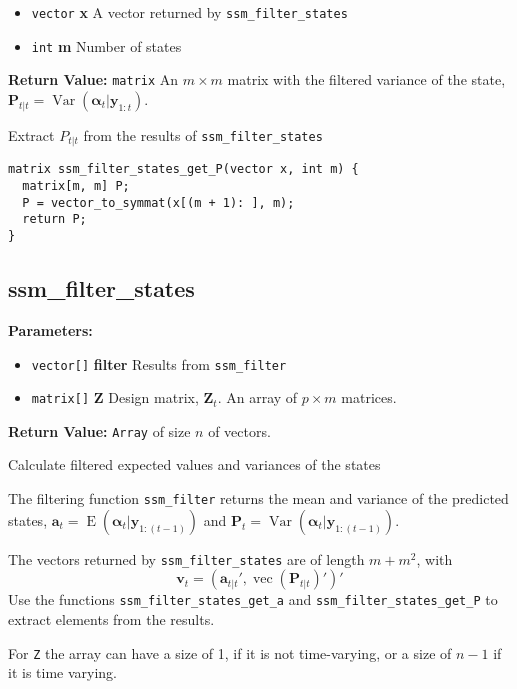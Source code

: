 \documentclass[]{book}
\providecommand{\tightlist}{%
  \setlength{\itemsep}{0pt}\setlength{\parskip}{0pt}}
\DeclareMathOperator{\E}{E}
\DeclareMathOperator{\Var}{Var}
\DeclareMathOperator{\VEC}{vec}
\newcommand{\mat}[1]{\boldsymbol{#1}}
\renewcommand{\vec}[1]{\boldsymbol{#1}}
\begin{document}
\begin{itemize}
\tightlist
\item
  \texttt{vector} \textbf{x} A vector returned by
  \texttt{ssm\_filter\_states}
\item
  \texttt{int} \textbf{m} Number of states
\end{itemize}

\textbf{Return Value:} \texttt{matrix} An \(m \times m\) matrix with the
filtered variance of the state,
\(\mat{P}_{t|t} = \Var(\vec{\alpha}_t | \vec{y}_{1:t})\).

Extract \(P_{t|t}\) from the results of \texttt{ssm\_filter\_states}

\begin{verbatim}
matrix ssm_filter_states_get_P(vector x, int m) {
  matrix[m, m] P;
  P = vector_to_symmat(x[(m + 1): ], m);
  return P;
}
\end{verbatim}

\subsection{ssm\_filter\_states}\label{ssmux5ffilterux5fstates-1}

\textbf{Parameters:}

\begin{itemize}
\tightlist
\item
  \texttt{vector{[}{]}} \textbf{filter} Results from
  \texttt{ssm\_filter}
\item
  \texttt{matrix{[}{]}} \textbf{Z} Design matrix, \(\mat{Z}_t\). An
  array of \(p \times m\) matrices.
\end{itemize}

\textbf{Return Value:} \texttt{Array} of size \(n\) of vectors.

Calculate filtered expected values and variances of the states

The filtering function \texttt{ssm\_filter} returns the mean and
variance of the predicted states,
\(\vec{a}_t = \E(\vec{\alpha}_t | \vec{y}_{1:(t -1)})\) and
\(\mat{P}_t = \Var(\vec{\alpha}_t | \vec{y}_{1:(t -1)})\).

The vectors returned by \texttt{ssm\_filter\_states} are of length
\(m + m ^ 2\), with \[
\vec{v}_t = (\vec{a}_{t|t}', \VEC(\vec{P}_{t|t})' )'
\] Use the functions \texttt{ssm\_filter\_states\_get\_a} and
\texttt{ssm\_filter\_states\_get\_P} to extract elements from the
results.

For \texttt{Z} the array can have a size of 1, if it is not
time-varying, or a size of \(n - 1\) if it is time varying.
\end{document}
